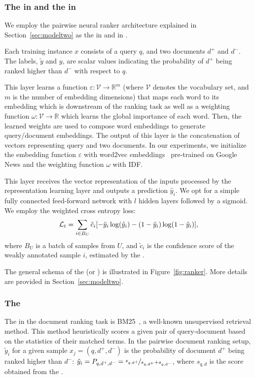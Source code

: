\subsubsection{The \tnet in \cws and the \std in \fwl}
We employ the pairwise neural ranker architecture explained in Section~\ref{sec:modeltwo} as the \tnet in \cws and \std in \fwl. 

Each training instance $x$ consists of a query $q$, and two documents $d^+$ and $d^-$. The labels, $\tilde{y}$ and $y$, are scalar values indicating the probability of $d^+$ being ranked higher than $d^-$ with respect to $q$.

This layer learns a function $\varepsilon: \mathcal{V} \rightarrow \mathbb{R}^{m}$  (where $\mathcal{V}$ denotes the vocabulary set, and $m$ is the number of embedding dimensions) that maps each word to its embedding which is downstream of the ranking task as well as a weighting function $\omega: \mathcal{V} \rightarrow \mathbb{R}$ which learns the global importance of each word. Then, the learned weights are used to compose word embeddings to generate query/document embeddings. The output of this layer is the concatenation of vectors representing query and two documents.
%
In our experiments, we initialize the embedding function $\varepsilon$ with word2vec embeddings~\cite{Mikolov:2013} pre-trained on Google News and the weighting function $\omega$ with IDF.

This layer receives the vector representation of the inputs processed by the representation learning layer and outputs a prediction $\hat{y}_i$.
We opt for a simple fully connected feed-forward network with $l$ hidden layers followed by a sigmoid. We employ the weighted cross entropy loss:
\begin{equation}
\small
\mathcal{L}_t = \sum_{i\in B_U} \tilde{c}_i [- \tilde{y}_i \log (\hat{y}_i) - (1-\tilde{y}_i) \log(1-\hat{y}_i)],
\end{equation}
where $B_U$ is a batch of samples from $U$, and $\tilde{c}_i$ is the confidence score of the weakly annotated sample $i$, estimated by the \cnet.

The general schema of the \tnet (or \std) is illustrated in Figure~\ref{fig:ranker}. More details are provided in Section~\ref{sec:modeltwo}.

\subsubsection{The \wa}
The \wa in the document ranking task is BM25~\citep{Robertson:2009}, a well-known unsupervised retrieval method. This method heuristically scores a given pair of query-document based on the statistics of their matched terms. In the pairwise document ranking setup, $\tilde{y}_i$ for a given sample $x_j = (q,d^+,d^-)$ is the probability of document $d^+$ being ranked higher than $d^-$: 
$\tilde{y}_i = P_{q,d^+,d^-} = \nicefrac{s_{q,d^+}}{s_{q,d^+} + s_{q,d^-}}$,  where $s_{q,d}$ is the score obtained from the \wa.



